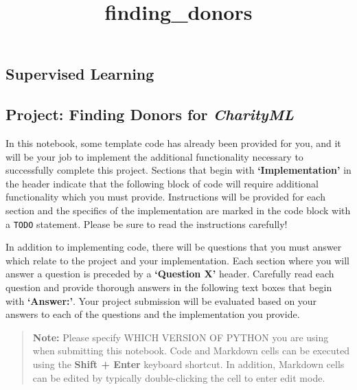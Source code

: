 \documentclass[11pt]{article}
\title{finding\_donors}
\begin{document}
    
    
    \maketitle
    
    

    
    \hypertarget{supervised-learning}{%
\subsection{Supervised Learning}\label{supervised-learning}}

\hypertarget{project-finding-donors-for-charityml}{%
\subsection{\texorpdfstring{Project: Finding Donors for
\emph{CharityML}}{Project: Finding Donors for CharityML}}\label{project-finding-donors-for-charityml}}

    In this notebook, some template code has already been provided for you,
and it will be your job to implement the additional functionality
necessary to successfully complete this project. Sections that begin
with \textbf{`Implementation'} in the header indicate that the following
block of code will require additional functionality which you must
provide. Instructions will be provided for each section and the
specifics of the implementation are marked in the code block with a
\texttt{\textquotesingle{}TODO\textquotesingle{}} statement. Please be
sure to read the instructions carefully!

In addition to implementing code, there will be questions that you must
answer which relate to the project and your implementation. Each section
where you will answer a question is preceded by a \textbf{`Question X'}
header. Carefully read each question and provide thorough answers in the
following text boxes that begin with \textbf{`Answer:'}. Your project
submission will be evaluated based on your answers to each of the
questions and the implementation you provide.

\begin{quote}
\textbf{Note:} Please specify WHICH VERSION OF PYTHON you are using when
submitting this notebook. Code and Markdown cells can be executed using
the \textbf{Shift + Enter} keyboard shortcut. In addition, Markdown
cells can be edited by typically double-clicking the cell to enter edit
mode.
\end{quote}
\end{document}
